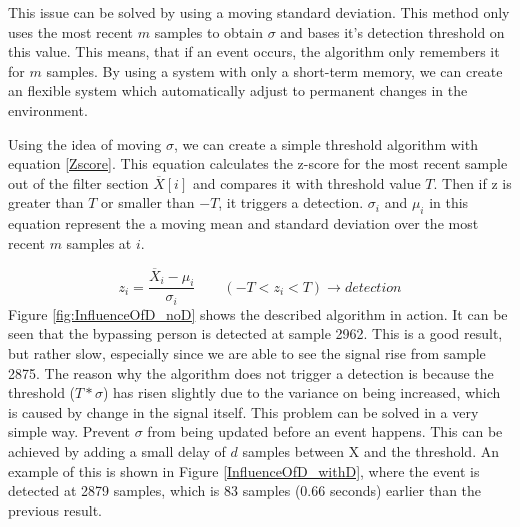 This issue can be solved by using a moving standard deviation. This method only uses the most recent $m$ samples to obtain $\sigma$ and bases it's detection threshold on this value. This means, that if an event occurs, the algorithm only remembers it for $m$ samples. By using a system with only a short-term memory, we can create an flexible system which automatically adjust to permanent changes in the environment.

Using the idea of moving $\sigma$, we can create a simple threshold algorithm with equation \ref{Zscore}. This equation calculates the z-score for the most recent sample out of the filter section $\overline{X}[i]$ and compares it with threshold value $T$. Then if z is greater than $T$ or smaller than $-T$, it triggers a detection. $\sigma_i$ and $\mu_i$ in this equation represent the a moving mean and standard deviation over the most recent $m$ samples at $i$.

\begin{equation}
	\label{Zscore}
	z_i = \frac{\overline{X}_i - \mu_i}{\sigma_i}
	\qquad
	(-T < z_i < T) \rightarrow detection 
\end{equation}
Figure \ref{fig:InfluenceOfD_noD} shows the described algorithm in action. It can be seen that the bypassing person is detected at sample 2962. This is a good result, but rather slow, especially since we are able to see the signal rise from sample 2875. The reason why the algorithm does not trigger a detection is because the threshold ($T * \sigma$) has risen slightly due to the variance on being increased, which is caused by change in the signal itself. This problem can be solved in a very simple way. Prevent $\sigma$ from being updated before an event happens. This can be achieved by adding a small delay of $d$ samples between X and the threshold. An example of this is shown in Figure \ref{InfluenceOfD_withD}, where the event is detected at 2879 samples, which is 83 samples (0.66 seconds) earlier than the previous result.

